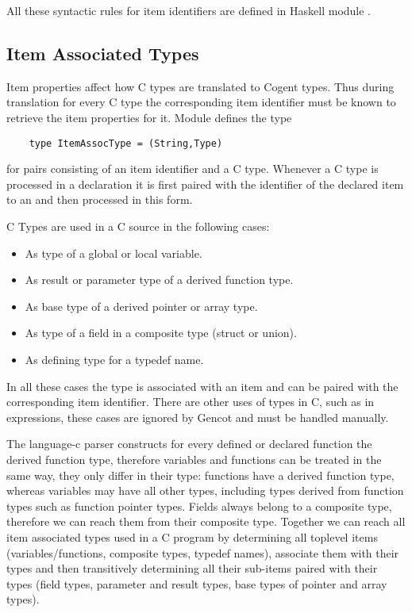All these syntactic rules for item identifiers are defined in Haskell module .

\subsection{Item Associated Types}
\label{impl-itemprops-types}

Item properties affect how C types are translated to Cogent types. Thus during translation for every C
type the corresponding item identifier must be known to retrieve the item properties for it. Module
 defines the type 
\begin{verbatim}
    type ItemAssocType = (String,Type)
\end{verbatim}
for pairs consisting of an item identifier and a C type. Whenever a C type is processed in a declaration
it is first paired with the identifier of the declared item to an  and then processed in
this form. 

C Types are used in a C source in the following cases:
\begin{itemize}
\item As type of a global or local variable.
\item As result or parameter type of a derived function type.
\item As base type of a derived pointer or array type.
\item As type of a field in a composite type (struct or union).
\item As defining type for a typedef name.
\end{itemize}
In all these cases the type is associated with an item and can be paired with the corresponding item identifier.
There are other uses of types in C, such as in  expressions, these cases are ignored by Gencot and 
must be handled manually.

The language-c
parser constructs for every defined or declared function the derived function type, therefore variables and functions
can be treated in the same way, they only differ in their type: functions have a derived function type, whereas
variables may have all other types, including types derived from function types such as function pointer types. Fields 
always belong to a composite type, therefore we can reach them from their composite type.
Together we can reach all item associated types used in a C program by determining all toplevel items (variables/functions, 
composite types, typedef names), associate them with their types and then transitively determining all their sub-items 
paired with their types (field types, parameter and result types, base types of pointer and array types). 

